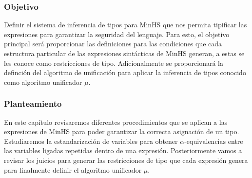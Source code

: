 \subsubsection{Objetivo}
Definir el sistema de inferencia de tipos para \textsf{MinHS} que nos permita tipificar las expresiones para garantizar la seguridad del lenguaje. Para esto, el objetivo principal será proporcionar las definiciones para las condiciones que cada estructura particular de las expresiones sintácticas de \textsf{MinHS} generan, a estas se les conoce como restricciones de tipo. Adicionalmente se proporcionará la definción del algoritmo de unificación para aplicar la inferencia de tipos conocido como algoritmo  unificador \textbf{$\mu$}.


\subsubsection{Planteamiento}
En este capítulo  revisaremos diferentes  procedimientos que se aplican a las expresiones de \textsf{MinHS} para poder garantizar la correcta  asignación de un tipo.
Estudiaremos la estandarización de variables para obtener $\alpha\text{-equivalencias}$ entre las variables ligadas repetidas dentro de una expresión.
Posteriormente vamos a revisar los juicios para generar las restricciones de tipo que cada expresión genera para finalmente definir el algoritmo unificador $\mu$.


